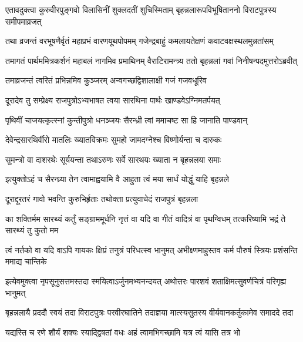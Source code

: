 
\twolineshloka
{एतावदुक्त्वा कुरुवीरपुङ्गवो विलासिनीं शुक्लदतीं शुचिस्मिताम्}
{बृहन्नलारूपविभूषिताननो विराटपुत्रस्य समीपमाव्रजत्}


\twolineshloka
{तथा व्रजन्तं वरभूषणैर्वृतं महाप्रभं वारणयूथपोपमम्}
{गजेन्द्रबाहुं कमलायतेक्षणं कवाटवक्षस्थलमुन्नतांसम्}


\twolineshloka
{तमागतं पार्थममित्रकर्शनं महाबलं नागमिव प्रमाथिनम्}
{वैराटिरामन्त्र्य ततो बृहन्नलां गवां निनीषन्पदमुत्तरोऽब्रवीत्}


\twolineshloka
{तमाव्रजन्तं त्वरितं प्रभिन्नमिव कुञ्जरम्}
{अन्वगच्छद्विशालाक्षी गजं गजवधूरिव}


\twolineshloka
{दूरादेव तु सम्प्रेक्ष्य राजपुत्रोऽभ्यभाषत}
{त्वया सारथिना पार्थः खाण्डवेऽग्निमतर्पयत्}


\twolineshloka
{पृथिवीं चाजयत्कृत्स्नां कुन्तीपुत्रो धनञ्जयः}
{सैरन्ध्री त्वां ममाचष्ट सा हि जानाति पाण्डवान्}


\twolineshloka
{देवेन्द्रसारथिर्वीरो मातलिः ख्यातविक्रमः}
{सुमहो जामदग्नेश्च विष्णोर्यन्ता च दारुकः}


\twolineshloka
{सुमन्त्रो वा दाशरथेः सूर्ययन्ता तथाऽरुणः}
{सर्वे सारथयः ख्याता न बृहन्नलया समाः}


\twolineshloka
{इत्युक्तोऽहं च सैरन्ध्र्या तेन त्वामाह्वयामि वै}
{आहुता त्वं मया सार्धं योद्धुं याहि बृहन्नले}


\twolineshloka
{दूराद्दूरतरं गावो भवन्ति कुरुभिर्हृताः}
{तथोक्ता प्रत्युवाचेदं राजपुत्रं बृहन्नला}


\threelineshloka
{का शक्तिर्मम सारथ्यं कर्तुं सङ्ग्राममूर्धनि}
{नृत्तं वा यदि वा गीतं वादित्रं वा पृथग्विधम्}
{तत्करिष्यामि भद्रं ते सारथ्यं तु कुतो मम}




\twolineshloka
{त्वं नर्तको वा यदि वाऽपि गायकः क्षिप्रं तनुत्रं परिधत्स्व भानुमत्}
{अभीक्ष्णमाहुस्तव कर्म पौरुषं स्त्रियः प्रशंसन्ति ममाद्य चान्तिके}



\twolineshloka
{इत्येवमुक्त्वा नृपसूनुसत्तमस्तदा स्मयित्वाऽर्जुनमभ्यनन्दयत्}
{अथोत्तरः पारशवं शताक्षिमत्सुवर्णचित्रं परिगृह्य भानुमत्}


\twolineshloka
{बृहन्नलायै प्रददौ स्वयं तदा विराटपुत्रः परवीरघातिने}
{तदाज्ञया मात्स्यसुतस्य वीर्यवानकर्तुकामेव समाददे तदा}




\twolineshloka
{यद्यस्ति च रणे शौर्यं शक्यः स्याद्द्विषतां वधः}
{अहं त्वामभिगच्छामि यत्र त्वं यासि तत्र भो}


